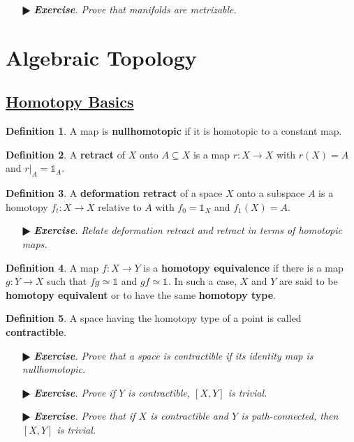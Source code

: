 \documentclass[11pt]{amsart}
\theoremstyle{definition}
\newtheorem*{definition*}{Definition}
\renewcommand\:{\colon}
\newcommand{\1}{\mathds{1}}
\newcommand{\exc}[1]{\vspace{-2.5pt}\begin{itemize}[leftmargin=15pt]\item[$\RHD$] \textit{\textbf{Exercise}. #1}\end{itemize}}
\begin{document}
\exc{Prove that manifolds are metrizable.}

\vskip40pt





\section*{Algebraic Topology}

\subsection*{\underline{Homotopy Basics}}

\begin{definition*}
	A map is \textbf{nullhomotopic} if it is homotopic to a constant map.
\end{definition*}

\begin{definition*}
	A \textbf{retract} of $X$ onto $A \subseteq X$ is a map $r\: X \to X$ with $r(X) = A$ and $r|_A = \1_A$.
\end{definition*}

\begin{definition*}
	A \textbf{deformation retract} of a space $X$ onto a subspace $A$ is a homotopy $f_t\: X \to X$ relative to $A$ with $f_0 = \1_X$ and $f_1(X) = A$.
\end{definition*}

\exc{Relate deformation retract and retract in terms of homotopic maps.}

\begin{definition*}
	A map $f\: X \to Y$ is a \textbf{homotopy equivalence} if there is a map $g\: Y \to X$ such that $fg \simeq \1$ and $gf \simeq \1$. In such a case, $X$ and $Y$ are said to be \textbf{homotopy equivalent} or to have the same \textbf{homotopy type}.
\end{definition*}

\begin{definition*}
	A space having the homotopy type of a point is called \textbf{contractible}.
\end{definition*}

\exc{Prove that a space is contractible if its identity map is nullhomotopic.}
\exc{Prove if $Y$ is contractible, $[X, Y]$ is trivial.}
\exc{Prove that if $X$ is contractible and $Y$ is path-connected, then $[X, Y]$ is trivial.}

\vskip20pt
\end{document}

